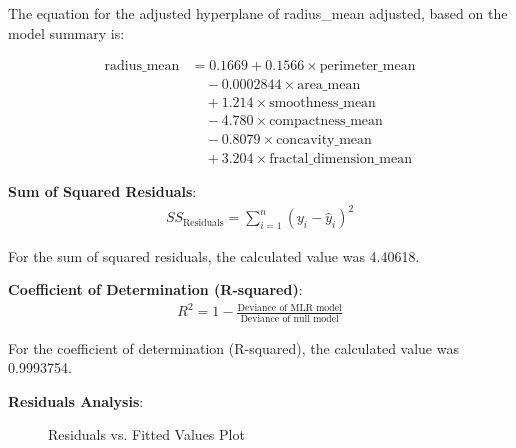 \documentclass[conference]{IEEEtran}
\begin{document}
\vspace{0.5cm}

The equation for the adjusted hyperplane of radius\_mean adjusted, based on the model summary is:

\begin{equation}
\begin{aligned}
\text{radius\_mean} &= 0.1669 + 0.1566 \times \text{perimeter\_mean}\\
&\quad - 0.0002844 \times \text{area\_mean}\\
&\quad + 1.214 \times \text{smoothness\_mean} \\
&\quad - 4.780 \times \text{compactness\_mean} \\
&\quad - 0.8079 \times \text{concavity\_mean} \\
&\quad + 3.204 \times \text{fractal\_dimension\_mean}
\end{aligned}
\end{equation}

\vspace{0.5cm}

\textbf{Sum of Squared Residuals}:
\begin{equation}
\begin{aligned}
SS_{\text{Residuals}} = \sum_{i=1}^{n} (y_i - \hat{y}_i)^2
\end{aligned}
\end{equation}

For the sum of squared residuals, the calculated value was 4.40618.

\vspace{0.5cm}

\textbf{Coefficient of Determination (R-squared)}:
\begin{equation}
\begin{aligned}
R^2 = 1 - \frac{\text{Deviance of MLR model}}{\text{Deviance of null model}}
\end{aligned}
\end{equation}

\vspace{0.5cm}
For the coefficient of determination (R-squared), the calculated value was 0.9993754.

\vspace{0.5cm}
\textbf{Residuals Analysis}:

\begin{figure}[!h]
      \centering
       {}
      \caption{Residuals vs. Fitted Values Plot}
      \label{fig:mlr_resvsfit}
\end{figure}
\end{document}
